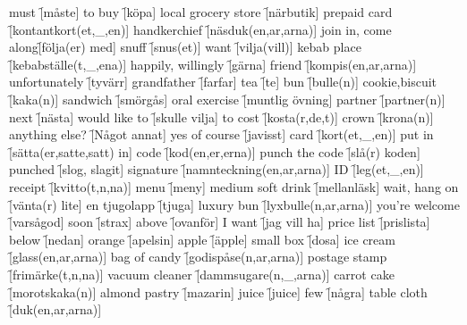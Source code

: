 \begin{questions}
    \begin{multicols}{2}
        \raggedcolumns
        \question must \f[måste]
        \question to buy \f[köpa]
        \question local grocery store \f[närbutik]
        \question prepaid card \f[kontantkort(et,\_,en)]
        \question handkerchief \f[näsduk(en,ar,arna)]
        \question join in, come along\f[följa(er) med]
        \question snuff \f[snus(et)]
        \question want \f[vilja(vill)]
        \question kebab place \f[kebabställe(t,\_,ena)]
        \question happily, willingly \f[gärna]
        \question friend \f[kompis(en,ar,arna)]
        \question unfortunately \f[tyvärr]
        \question grandfather \f[farfar]
        \question tea \f[te]
        \question bun \f[bulle(n)]
        \question cookie,biscuit \f[kaka(n)]
        \question sandwich \f[smörgås]
        \question oral exercise \f[muntlig övning]
        \question partner \f[partner(n)]
        \question next \f[nästa]
        \question would like to \f[skulle vilja]
        \question to cost \f[kosta(r,de,t)]
        \question crown \f[krona(n)]
        \question anything else? \f[Något annat]
        \question yes of course \f[javisst]
        \question card \f[kort(et,\_,en)]
        \question put in \f[sätta(er,satte,satt) in]
        \question code \f[kod(en,er,erna)]
        \question punch the code \f[slå(r) koden]
        \question punched \f[slog, slagit]
        \question signature \f[namnteckning(en,ar,arna)]
        \question ID \f[leg(et,\_,en)]
        \question receipt \f[kvitto(t,n,na)]
        \question menu \f[meny]
        \question medium soft drink \f[mellanläsk]
        \question wait, hang on \f[vänta(r) lite]
        \question en tjugolapp \f[tjuga]
        \question luxury bun \f[lyxbulle(n,ar,arna)]
        \question you're welcome \f[varsågod]
        \question soon \f[strax]
        \question above \f[ovanför]
        \question I want \f[jag vill ha]
        \question price list \f[prislista]
        \question below \f[nedan]
        \question orange \f[apelsin]
        \question apple \f[äpple]
        \question small box \f[dosa]
        \question ice cream \f[glass(en,ar,arna)]
        \question bag of candy \f[godispåse(n,ar,arna)]
        \question postage stamp \f[frimärke(t,n,na)]
        \question vacuum cleaner \f[dammsugare(n,\_,arna)]
        \question carrot cake \f[morotskaka(n)]
        \question almond pastry \f[mazarin]
        \question juice \f[juice]
        \question few \f[några]
        \question table cloth \f[duk(en,ar,arna)]

\end{multicols}
\end{questions}
